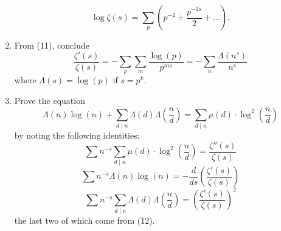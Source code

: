 \documentclass[12pt]{article}
\begin{document}
\begin{enumerate}
    \begin{equation}
        \log \zeta(s) = \sum_{p}(p^{-2} + \frac{p^{-2s}}{2} + ...).
    \end{equation}
    \item From (11), conclude
    \begin{equation}
        \frac{\zeta'(s)}{\zeta(s)} 
        = -\sum_{p}\sum_{m}\frac{\log(p)}{p^{ms}}
        = -\sum_{n}\frac{\Lambda(n^{s})}{n^{s}}
    \end{equation}
    where $\Lambda(s) = \log(p)$ if $s = p^{k}$.
    \item Prove the equation
    \begin{equation}
        \Lambda(n)\log(n) + \sum_{d \mid n}\Lambda(d)\Lambda(\frac{n}{d})
        = \sum_{d \mid n} \mu(d) \cdot \log^{2}(\frac{n}{d})
    \end{equation}
    by noting the following identities:
    \begin{equation}
        \sum n^{-s}\sum_{d \mid n} \mu(d) \cdot \log^{2}(\frac{n}{d}) = \frac{\zeta''(s)}{\zeta(s)}
    \end{equation}
    \begin{equation}
        \sum n^{-s} \Lambda(n)\log(n) =
        - \frac{d}{ds}(\frac{\zeta'(s)}{\zeta(s)})
    \end{equation}
    \begin{equation}
        \sum n^{-s} \sum_{d \mid n}\Lambda(d)\Lambda(\frac{n}{d}) =
        (\frac{\zeta'(s)}{\zeta(s)})^{2}
    \end{equation}
    the last two of which come from (12).
\end{enumerate}
\end{document}

